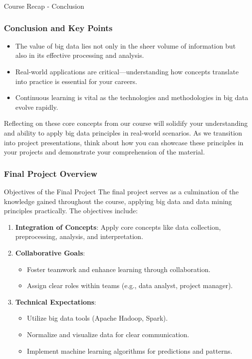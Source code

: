\documentclass[aspectratio=169]{beamer}
\begin{document}
\begin{frame}[fragile]{Course Recap - Conclusion}
    \frametitle{Conclusion and Key Points}
    \begin{itemize}
        \item The value of big data lies not only in the sheer volume of information but also in its effective processing and analysis.
        \item Real-world applications are critical—understanding how concepts translate into practice is essential for your careers.
        \item Continuous learning is vital as the technologies and methodologies in big data evolve rapidly.
    \end{itemize}

    Reflecting on these core concepts from our course will solidify your understanding and ability to apply big data principles in real-world scenarios. 
    As we transition into project presentations, think about how you can showcase these principles in your projects and demonstrate your comprehension of the material.
\end{frame}

\begin{frame}[fragile]
    \frametitle{Final Project Overview}
    \begin{block}{Objectives of the Final Project}
        The final project serves as a culmination of the knowledge gained throughout the course, applying big data and data mining principles practically. The objectives include:
    \end{block}
    \begin{enumerate}
        \item \textbf{Integration of Concepts}: Apply core concepts like data collection, preprocessing, analysis, and interpretation.
        
        \item \textbf{Collaborative Goals}:
            \begin{itemize}
                \item Foster teamwork and enhance learning through collaboration.
                \item Assign clear roles within teams (e.g., data analyst, project manager).
            \end{itemize}
        
        \item \textbf{Technical Expectations}:
            \begin{itemize}
                \item Utilize big data tools (Apache Hadoop, Spark).
                \item Normalize and visualize data for clear communication.
                \item Implement machine learning algorithms for predictions and patterns.
            \end{itemize}
    \end{enumerate}
\end{frame}
\end{document}
